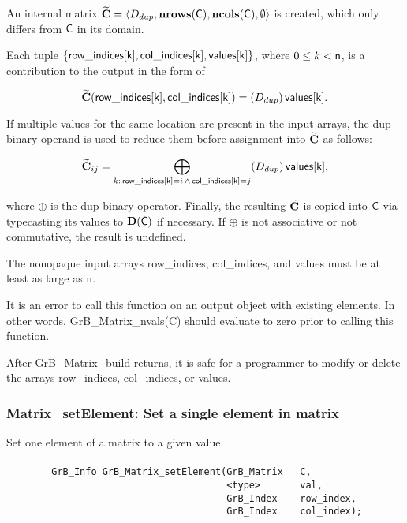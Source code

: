 An internal matrix ${\bf \widetilde{C}} = \langle D_{dup},
    \mathbf{nrows}({\sf C}),
    \mathbf{ncols}({\sf C}),\emptyset \rangle$ is created, which only differs from ${\sf C}$ in its domain.

Each tuple $\{ {\sf row\_indices[k]}, {\sf col\_indices[k]}, {\sf values[k]}\}$, where $0\leq k < {\sf n}$, is a contribution to the output in the form of 

$${\bf \widetilde{C}}({\sf row\_indices[k]}, {\sf col\_indices[k]}) =  (D_{dup})\, {\sf values[k]}.$$

If multiple values for the same location are present in the input arrays, the 
{\sf dup} binary operand is used to reduce them before assignment into ${\bf \widetilde{C}}$ as follows:

\[
{\bf \widetilde{C}}_{ij}
= \bigoplus_{k:\, {\sf row\_indices[k]} = i\, \land\, {\sf col\_indices[k]} = j}   (D_{dup})\,{\sf values[k]}
,\] 

where $\oplus$ is the {\sf dup} binary operator. Finally, the resulting 
${\bf \widetilde{C}}$ is copied into ${\sf C}$ via typecasting its values to 
$\mathbf{D}({\sf C})$ if necessary.  If $\oplus$ is not associative or not 
commutative, the result is undefined.  

The nonopaque input arrays {\sf row\_indices}, {\sf col\_indices}, and {\sf values} must be at least as large as {\sf n}. 

It is an error to call this function on an output object with existing elements. In other words, 
{\sf GrB\_Matrix\_nvals(C)} should evaluate to zero prior to calling this function.

After {\sf GrB\_Matrix\_build} returns, it is safe for a programmer to 
modify or delete the arrays {\sf row\_indices}, {\sf col\_indices}, or {\sf values}.



\subsubsection{{\sf Matrix\_setElement}: Set a single element in matrix}

Set one element of a matrix to a given value.

\paragraph{\syntax}

\begin{verbatim}
        GrB_Info GrB_Matrix_setElement(GrB_Matrix   C,
                                       <type>       val,
                                       GrB_Index    row_index,
                                       GrB_Index    col_index); 
\end{verbatim}


